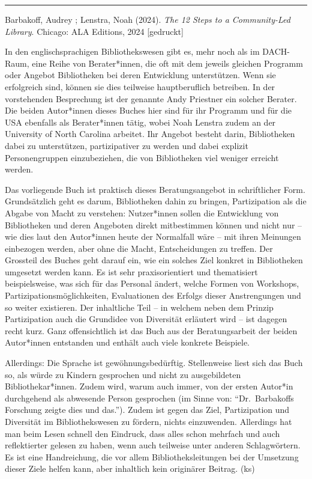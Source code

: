 \documentclass[a4paper,
fontsize=11pt,
oneside,
numbers=noperiodatend,
parskip=half-,
bibliography=totoc,
final
]{scrartcl}
\begin{document}
\begin{center}\rule{0.5\linewidth}{0.5pt}\end{center}

Barbakoff, Audrey ; Lenstra, Noah (2024). \emph{The 12 Steps to a
Community-Led Library}. Chicago: ALA Editions, 2024 {[}gedruckt{]}

In den englischsprachigen Bibliothekswesen gibt es, mehr noch als im
DACH-Raum, eine Reihe von Berater*innen, die oft mit dem jeweils
gleichen Programm oder Angebot Bibliotheken bei deren Entwicklung
unterstützen. Wenn sie erfolgreich sind, können sie dies teilweise
hauptberuflich betreiben. In der vorstehenden Besprechung ist der
genannte Andy Priestner ein solcher Berater. Die beiden Autor*innen
dieses Buches hier sind für ihr Programm und für die USA ebenfalls als
Berater*innen tätig, wobei Noah Lenstra zudem an der University of North
Carolina arbeitet. Ihr Angebot besteht darin, Bibliotheken dabei zu
unterstützen, partizipativer zu werden und dabei explizit
Personengruppen einzubeziehen, die von Bibliotheken viel weniger
erreicht werden.

Das vorliegende Buch ist praktisch dieses Beratungsangebot in
schriftlicher Form. Grundsätzlich geht es darum, Bibliotheken dahin zu
bringen, Partizipation als die Abgabe von Macht zu verstehen:
Nutzer*innen sollen die Entwicklung von Bibliotheken und deren Angeboten
direkt mitbestimmen können und nicht nur -- wie dies laut den
Autor*innen heute der Normalfall wäre -- mit ihren Meinungen einbezogen
werden, aber ohne die Macht, Entscheidungen zu treffen. Der Grossteil
des Buches geht darauf ein, wie ein solches Ziel konkret in Bibliotheken
umgesetzt werden kann. Es ist sehr praxisorientiert und thematisiert
beispielsweise, was sich für das Personal ändert, welche Formen von
Workshops, Partizipationsmöglichkeiten, Evaluationen des Erfolgs dieser
Anstrengungen und so weiter existieren. Der inhaltliche Teil -- in
welchem neben dem Prinzip Partizipation auch die Grundidee von
Diversität erläutert wird -- ist dagegen recht kurz. Ganz offensichtlich
ist das Buch aus der Beratungsarbeit der beiden Autor*innen entstanden
und enthält auch viele konkrete Beispiele.

Allerdings: Die Sprache ist gewöhnungsbedürftig. Stellenweise liest sich
das Buch so, als würde zu Kindern gesprochen und nicht zu ausgebildeten
Bibliothekar*innen. Zudem wird, warum auch immer, von der ersten
Autor*in durchgehend als abwesende Person gesprochen (im Sinne von:
``Dr.~Barbakoffs Forschung zeigte dies und das.''). Zudem ist gegen das
Ziel, Partizipation und Diversität im Bibliothekswesen zu fördern,
nichts einzuwenden. Allerdings hat man beim Lesen schnell den Eindruck,
dass alles schon mehrfach und auch reflektierter gelesen zu haben, wenn
auch teilweise unter anderen Schlagwörtern. Es ist eine Handreichung,
die vor allem Bibliotheksleitungen bei der Umsetzung dieser Ziele helfen
kann, aber inhaltlich kein originärer Beitrag. (ks)
\end{document}
